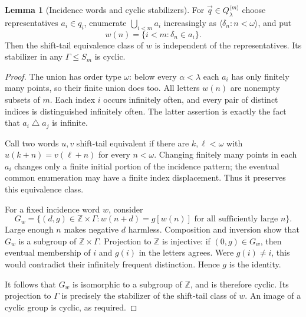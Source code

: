 \documentclass[11pt,letterpaper]{article}
\theoremstyle{definition}
\newtheorem{lemma}[definition]{Lemma}
\numberwithin{equation}{section}
\begin{document}
\begin{lemma}[Incidence words and cyclic stabilizers]\label{lem:cyclic}
For $\vec q\in Q_\lambda^{\langle m\rangle}$ choose representatives $a_i\in q_i$, enumerate $\bigcup_{i<m}a_i$ increasingly as $\langle\delta_n:n<\omega\rangle$, and put
\[
 w(n)=\{i<m:\delta_n\in a_i\}.
\]
Then the shift-tail equivalence class of $w$ is independent of the representatives. Its stabilizer in any $\Gamma\leq S_m$ is cyclic.
\end{lemma}
\begin{proof}
The union has order type $\omega$: below every $\alpha<\lambda$ each $a_i$ has only finitely many points, so their finite union does too. All letters $w(n)$ are nonempty subsets of $m$. Each index $i$ occurs infinitely often, and every pair of distinct indices is distinguished infinitely often. The latter assertion is exactly the fact that $a_i\mathbin\triangle a_j$ is infinite.

Call two words $u,v$ shift-tail equivalent if there are $k,\ell<\omega$ with $u(k+n)=v(\ell+n)$ for every $n<\omega$. Changing finitely many points in each $a_i$ changes only a finite initial portion of the incidence pattern; the eventual common enumeration may have a finite index displacement. Thus it preserves this equivalence class.

For a fixed incidence word $w$, consider
\[
 G_w=\{(d,g)\in\mathbb Z\times\Gamma:
       w(n+d)=g[w(n)]\text{ for all sufficiently large }n\}.
\]
Large enough $n$ makes negative $d$ harmless. Composition and inversion show that $G_w$ is a subgroup of $\mathbb Z\times\Gamma$. Projection to $\mathbb Z$ is injective: if $(0,g)\in G_w$, then eventual membership of $i$ and $g(i)$ in the letters agrees. Were $g(i)\ne i$, this would contradict their infinitely frequent distinction. Hence $g$ is the identity.

It follows that $G_w$ is isomorphic to a subgroup of $\mathbb Z$, and is therefore cyclic. Its projection to $\Gamma$ is precisely the stabilizer of the shift-tail class of $w$. An image of a cyclic group is cyclic, as required.
\end{proof}
\end{document}
